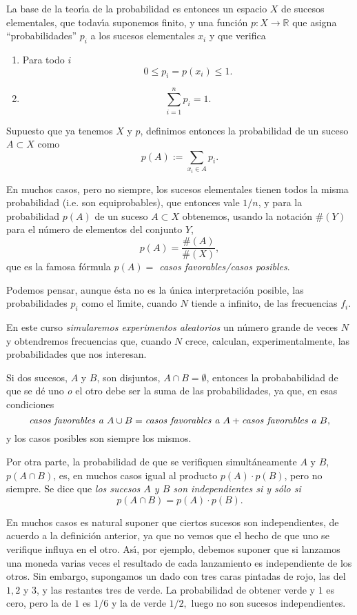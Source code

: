 La base de la teor\'{\i}a de la probabilidad es entonces un espacio $X$ de
sucesos elementales, que todav\'{\i}a suponemos finito,  y una funci\'on $p:X\to
\mathbb{R}$ que asigna ``probabilidades'' $p_i$ a los sucesos elementales $x_i$
y que verifica
\begin{enumerate}
 \item Para todo $i$ 
 \[0\le p_i=p(x_i)\le 1.\]
 \item 
 \[\sum_{i=1}^{n}p_i=1.\]
 \end{enumerate}
 
 Supuesto que ya tenemos $X$ y $p$, definimos entonces la probabilidad de un
suceso $A\subset X$ como 
 \[p(A):=\sum_{x_i\in A}p_i.\]
 
 En muchos casos, {\sc pero no siempre}, los sucesos elementales tienen todos la
misma probabilidad (i.e. son equiprobables), que entonces vale $1/n$, y para la
probabilidad $p(A)$ de un suceso $A\subset X$ obtenemos, usando la notaci\'on
$\#(Y)$ para el n\'umero de elementos del conjunto $Y$, 
\[p(A)=\frac{\#(A)}{\#(X)},\]
\noindent que es la famosa f\'ormula {\itshape $p(A)=$ casos favorables/casos
posibles}. 

 
 
Podemos pensar, aunque \'esta no es la \'unica  interpretaci\'on posible, las
probabilidades $p_i$ como el l\'{\i}mite, cuando $N$ tiende a infinito, de las
frecuencias $f_i$.

En este curso {\itshape simularemos experimentos aleatorios} un n\'umero grande
de veces $N$ y obtendremos frecuencias que, cuando $N$ crece, calculan,
experimentalmente, las probabilidades que nos interesan.  

Si dos sucesos,  $A$ y $B$, son disjuntos, $A\cap B=\emptyset$, entonces la 
probababilidad de que se d\'e uno {\itshape o} el otro debe ser la suma de las 
probabilidades, ya que, en esas condiciones
\[\text{{\itshape casos favorables a }}A\cup B=\text{{\itshape casos favorables 
a 
}}A+\text{{\itshape casos favorables a }}B,\]
\noindent y los casos posibles son siempre los mismos.

Por otra parte, la probabilidad de que se verifiquen simult\'aneamente $A$ y 
$B$,  $p(A\cap B)$, es, en muchos casos igual al producto $p(A)\cdot p(B)$, 
pero no siempre.  Se dice que {\itshape los sucesos $A$ y $B$ son 
independientes si y s\'olo si 
\[p(A\cap B)=p(A)\cdot p(B).\]}

En muchos casos es natural suponer que ciertos sucesos son independientes, de 
acuerdo a la definici\'on anterior,  ya que no vemos que el hecho de que uno se 
verifique influya en el otro. As\'{\i}, por ejemplo, debemos suponer que si 
lanzamos una moneda varias veces el resultado de cada lanzamiento es 
independiente de los otros. Sin embargo, supongamos un dado con tres caras 
pintadas de rojo, las del $1,2$ y $3$,  y las restantes tres de verde. 
La probabilidad de obtener verde y $1$ es cero, pero la de $1$ es $1/6$ y la de 
verde $1/2,$ luego no son sucesos independientes.

